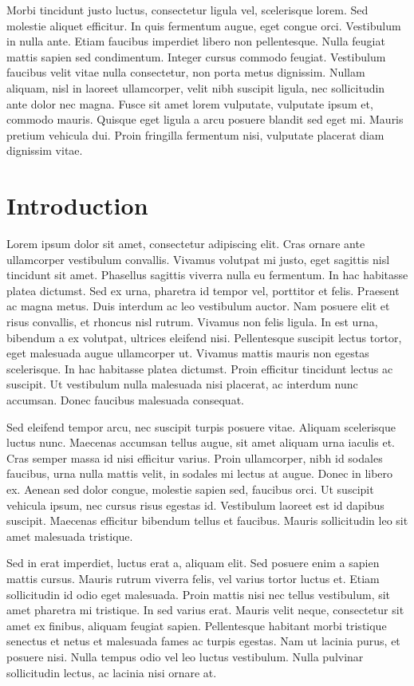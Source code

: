 \documentclass[a4paper,12pt]{report}
\begin{document}
{
Morbi tincidunt justo luctus, consectetur ligula vel, scelerisque lorem. Sed molestie aliquet efficitur. In quis fermentum augue, eget congue orci. Vestibulum in nulla ante. Etiam faucibus imperdiet libero non pellentesque. Nulla feugiat mattis sapien sed condimentum. Integer cursus commodo feugiat. Vestibulum faucibus velit vitae nulla consectetur, non porta metus dignissim. Nullam aliquam, nisl in laoreet ullamcorper, velit nibh suscipit ligula, nec sollicitudin ante dolor nec magna. Fusce sit amet lorem vulputate, vulputate ipsum et, commodo mauris. Quisque eget ligula a arcu posuere blandit sed eget mi. Mauris pretium vehicula dui. Proin fringilla fermentum nisi, vulputate placerat diam dignissim vitae.
	}

\chapter{Introduction} %

Lorem ipsum dolor sit amet, consectetur adipiscing elit. Cras ornare ante ullamcorper vestibulum convallis. Vivamus volutpat mi justo, eget sagittis nisl tincidunt sit amet. Phasellus sagittis viverra nulla eu fermentum. In hac habitasse platea dictumst. Sed ex urna, pharetra id tempor vel, porttitor et felis. Praesent ac magna metus. Duis interdum ac leo vestibulum auctor. Nam posuere elit et risus convallis, et rhoncus nisl rutrum. Vivamus non felis ligula. In est urna, bibendum a ex volutpat, ultrices eleifend nisi. Pellentesque suscipit lectus tortor, eget malesuada augue ullamcorper ut. Vivamus mattis mauris non egestas scelerisque. In hac habitasse platea dictumst. Proin efficitur tincidunt lectus ac suscipit. Ut vestibulum nulla malesuada nisi placerat, ac interdum nunc accumsan. Donec faucibus malesuada consequat.

Sed eleifend tempor arcu, nec suscipit turpis posuere vitae. Aliquam scelerisque luctus nunc. Maecenas accumsan tellus augue, sit amet aliquam urna iaculis et. Cras semper massa id nisi efficitur varius. Proin ullamcorper, nibh id sodales faucibus, urna nulla mattis velit, in sodales mi lectus at augue. Donec in libero ex. Aenean sed dolor congue, molestie sapien sed, faucibus orci. Ut suscipit vehicula ipsum, nec cursus risus egestas id. Vestibulum laoreet est id dapibus suscipit. Maecenas efficitur bibendum tellus et faucibus. Mauris sollicitudin leo sit amet malesuada tristique.

Sed in erat imperdiet, luctus erat a, aliquam elit. Sed posuere enim a sapien mattis cursus. Mauris rutrum viverra felis, vel varius tortor luctus et. Etiam sollicitudin id odio eget malesuada. Proin mattis nisi nec tellus vestibulum, sit amet pharetra mi tristique. In sed varius erat. Mauris velit neque, consectetur sit amet ex finibus, aliquam feugiat sapien. Pellentesque habitant morbi tristique senectus et netus et malesuada fames ac turpis egestas. Nam ut lacinia purus, et posuere nisi. Nulla tempus odio vel leo luctus vestibulum. Nulla pulvinar sollicitudin lectus, ac lacinia nisi ornare at.
\end{document}
